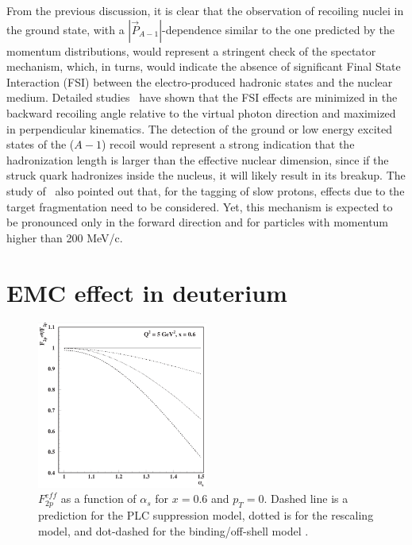 From the previous discussion, it is clear that the observation of recoiling nuclei in the ground state, with a $|\vec P_{A-1}|$-dependence similar to the one predicted by the momentum distributions, would represent a stringent check of the spectator mechanism, which, in turns, would indicate the absence of significant Final State Interaction (FSI) between the electro-produced hadronic states and the nuclear medium. Detailed studies~\cite{Melnitchouk1997,CiofidegliAtti2003,ciofi2004,klimenko2006,Alvioli:2006jd,Palli2009} have shown that the FSI effects are minimized in the backward recoiling angle relative to the virtual photon direction and maximized in perpendicular kinematics. The detection of the ground or low energy excited states of the ($A-1$) recoil would represent a strong indication that the hadronization length is larger than the effective nuclear dimension, since if the struck quark hadronizes inside the nucleus, it will likely result in its breakup. The study of~\cite{Palli2009} also pointed out that, for the tagging of slow protons, effects due to the target fragmentation need to be considered. Yet, this mechanism is expected to be pronounced only in the forward direction and for particles with momentum higher than 200 MeV/c. 

\section{EMC effect in deuterium}

\begin{figure}
  \begin{center}
    \includegraphics[angle=0, width=0.5\textwidth]{./fig-chap1/plotMel2}
    \caption{$F_{2p}^{eff}$ as a function of $\alpha_s$ for $x = 0.6$ and $p_T = 0$. Dashed line is a prediction for the PLC suppression model, dotted is for the rescaling model, and dot-dashed for the binding/off-shell model \cite{Melnitchouk1997}.}
    \label{fig:mel}
  \end{center}
\end{figure}

